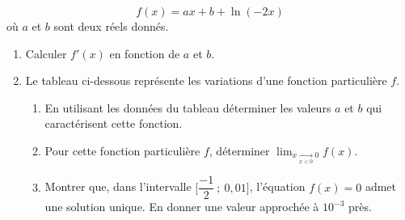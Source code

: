 	\[
	  f(x)=ax+b+\ln(-2x)
	\]
	où $a$ et $b$ sont deux réels donnés.

	\begin{enumerate}
	\item Calculer $f'(x)$ en fonction de $a$ et $b$.
	\item Le tableau ci-dessous représente les variations d'une fonction particulière $f$.

	\medskip
	\begin{center}
	\end{center}

	\medskip
	\begin{enumerate}
	\item En utilisant les données du tableau déterminer les valeurs $a$ et $b$ qui caractérisent
	 cette fonction.
	\item Pour cette fonction particulière $f$, déterminer
	        $\displaystyle \lim_{x \xrightarrow[x<0]{} 0} f(x)$.
	\item Montrer que, dans l'intervalle $\Big[\dfrac{-1}{2}~;~0,01\Big]$, l'équation $f(x)=0$
	 admet une solution unique. En donner une valeur approchée à $10^{-3}$ près.
	\end{enumerate}
	\end{enumerate}

